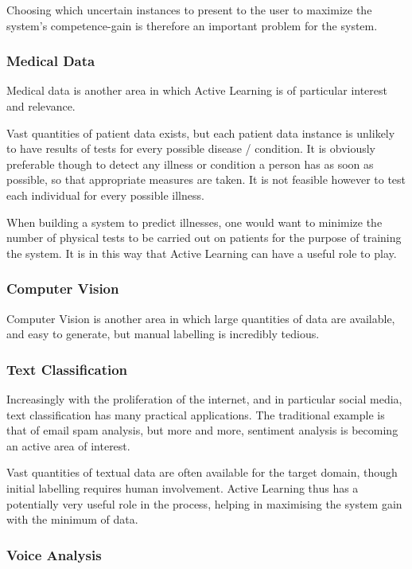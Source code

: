 \documentclass[a4paper,11pt]{report}
\begin{document}
Choosing which uncertain instances to present to the user to maximize the system's competence-gain is therefore an important problem for the system.

\subsubsection{Medical Data}
Medical data is another area in which Active Learning is of particular interest and relevance.

Vast quantities of patient data exists, but each patient data instance is unlikely to have results of tests for every possible disease / condition. It is obviously preferable though to detect any illness or condition a person has as soon as possible, so that appropriate measures are taken. It is not feasible however to test each individual for every possible illness.

When building a system to predict illnesses, one would want to minimize the number of physical tests to be carried out on patients for the purpose of training the system. It is in this way that Active Learning can have a useful role to play.

\subsubsection{Computer Vision}
Computer Vision is another area in which large quantities of data are available, and easy to generate, but manual labelling is incredibly tedious.

\subsubsection{Text Classification}
Increasingly with the proliferation of the internet, and in particular social media, text classification has many practical applications. The traditional example is that of email spam analysis, but more and more, sentiment analysis is becoming an active area of interest.

Vast quantities of textual data are often available for the target domain, though initial labelling requires human involvement. Active Learning thus has a potentially very useful role in the process, helping in maximising the system gain with the minimum of data.

\subsubsection{Voice Analysis}
\end{document}
